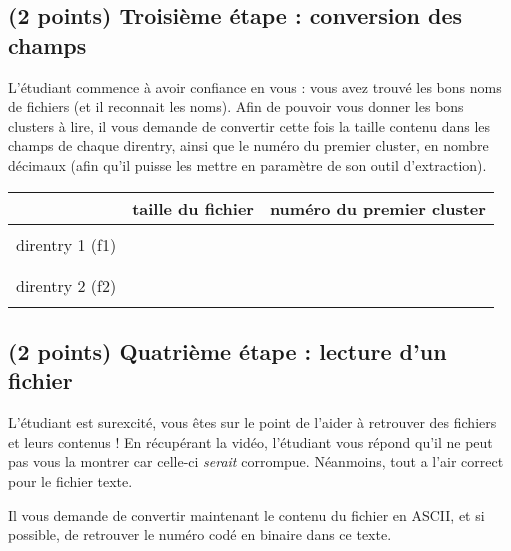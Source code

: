 \documentclass[11pt,a4paper]{article}
\begin{document}

\newpage

\subsection{(2 points) Troisième étape : conversion des champs }

L'étudiant commence à avoir confiance en vous : vous avez trouvé les bons noms de fichiers (et il reconnait les noms).
Afin de pouvoir vous donner les bons clusters à lire, il vous demande de convertir cette fois la taille contenu dans les champs de chaque direntry, ainsi que le numéro du premier cluster, en nombre décimaux (afin qu'il puisse les mettre en paramètre de son outil d'extraction).

\smallskip

\begin{center}
\begin{tabular}{ | c | C{5cm} | C{7.5cm} | }
\hline
 & taille du fichier & numéro du premier cluster \\
\hline
 & & \\
direntry 1 (f1) & & \\
 & & \\
\hline
 & & \\
direntry 2 (f2) & & \\
 & & \\
\hline
\end{tabular}
\end{center}

\smallskip

\subsection{(2 points) Quatrième étape : lecture d'un fichier }

L'étudiant est surexcité, vous êtes sur le point de l'aider à retrouver des fichiers et leurs contenus !
En récupérant la vidéo, l'étudiant vous répond qu'il ne peut pas vous la montrer car celle-ci \textit{serait} corrompue.
Néanmoins, tout a l'air correct pour le fichier texte.

\smallskip

Il vous demande de convertir maintenant le contenu du fichier en ASCII, et si possible, de retrouver le numéro codé en binaire dans ce texte.
\end{document}
